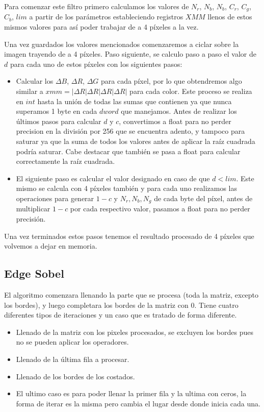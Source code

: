 Para comenzar este filtro primero calculamos los valores de $N_r$, $N_b$, $N_b$, $C_r$, $C_g$, $C_b$, $lim$ a partir de los parámetros estableciendo registros $XMM$ llenos de estos mismos valores para así poder trabajar de a 4 píxeles a la vez. 

Una vez guardados los valores mencionados comenzaremos a ciclar sobre la imagen trayendo de a 4 píxeles. Paso siguiente, se calculo paso a paso el valor de $d$ para cada uno de estos píxeles con los siguientes pasos:

\begin{itemize}
  \item Calcular los $\Delta B$, $\Delta R$, $\Delta G$ para cada píxel, por lo que obtendremos algo similar a $xmm = | \Delta R | \Delta R | \Delta R | \Delta R |$ para cada color. Este proceso se realiza en $int$ hasta la unión de todas las sumas que contienen ya que nunca superamos 1 byte en cada $dword$ que manejamos. Antes de realizar los últimos pasos para calcular $d$ y $c$, convertimos a float para no perder precision en la división por 256 que se encuentra adento, y tampoco para saturar ya que la suma de todos los valores antes de aplicar la raíz cuadrada podría saturar. Cabe destacar que también se pasa a float para calcular correctamente la raíz cuadrada. 
  \item El siguiente paso es calcular el valor designado en caso de que $d<lim$. Este mismo se calcula con 4 píxeles también y para cada uno realizamos las operaciones para generar $1-c$ y $N_r,N_b,N_g$ de cada byte del píxel, antes de multiplicar $1-c$ por cada respectivo valor, pasamos a float para no perder precisión. 
\end{itemize}

Una vez terminados estos pasos tenemos el resultado procesado de 4 píxeles que volvemos a dejar en memoria.


\subsection{Edge Sobel}
El algoritmo comenzara llenando la parte que se procesa (toda la matriz, excepto los bordes),
y luego completara los bordes de la matriz con 0.
Tiene cuatro diferentes tipos de iteraciones y un caso que es tratado de forma diferente.
\begin{itemize}
\item Llenado de la matriz con los pixeles procesados, se excluyen los bordes pues no se pueden aplicar los operadores.
\item Llenado de la última fila a procesar.
\item Llenado de los bordes de los costados.
\item El ultimo caso es para poder llenar la primer fila y la ultima con ceros, la forma de iterar es la misma pero cambia el lugar desde donde inicia cada una.
\end{itemize}
